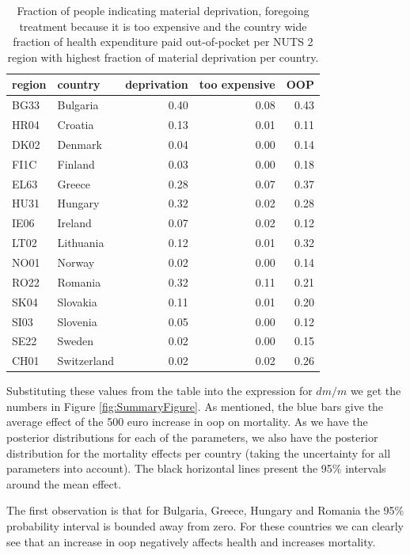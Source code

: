 \documentclass[a4paper,12pt]{article}
\begin{document}
\begin{table}[htbp]
\caption{\label{tab:region_per_country}Fraction of people indicating material deprivation, foregoing treatment because it is too expensive and the country wide fraction of health expenditure paid out-of-pocket per NUTS 2 region with highest fraction of material deprivation per country.}
\centering
\begin{tabular}{llrrr}
region & country & deprivation & too expensive & OOP\\[0pt]
\hline
BG33 & Bulgaria & 0.40 & 0.08 & 0.43\\[0pt]
HR04 & Croatia & 0.13 & 0.01 & 0.11\\[0pt]
DK02 & Denmark & 0.04 & 0.00 & 0.14\\[0pt]
FI1C & Finland & 0.03 & 0.00 & 0.18\\[0pt]
EL63 & Greece & 0.28 & 0.07 & 0.37\\[0pt]
HU31 & Hungary & 0.32 & 0.02 & 0.28\\[0pt]
IE06 & Ireland & 0.07 & 0.02 & 0.12\\[0pt]
LT02 & Lithuania & 0.12 & 0.01 & 0.32\\[0pt]
NO01 & Norway & 0.02 & 0.00 & 0.14\\[0pt]
RO22 & Romania & 0.32 & 0.11 & 0.21\\[0pt]
SK04 & Slovakia & 0.11 & 0.01 & 0.20\\[0pt]
SI03 & Slovenia & 0.05 & 0.00 & 0.12\\[0pt]
SE22 & Sweden & 0.02 & 0.00 & 0.15\\[0pt]
CH01 & Switzerland & 0.02 & 0.02 & 0.26\\[0pt]
\end{tabular}
\end{table}

Substituting these values from the table into the expression for \(dm/m\) we get the numbers in Figure \ref{fig:SummaryFigure}. As mentioned, the blue bars give the average effect of the 500 euro increase in oop on mortality. As we have the posterior distributions for each of the parameters, we also have the posterior distribution for the mortality effects per country (taking the uncertainty for all parameters into account). The black horizontal lines present the 95\% intervals around the mean effect. 

The first observation is that for Bulgaria, Greece, Hungary and Romania the 95\% probability interval is bounded away from zero. For these countries we can clearly see that an increase in oop negatively affects health and increases mortality. 
\end{document}
